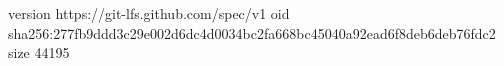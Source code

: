 version https://git-lfs.github.com/spec/v1
oid sha256:277fb9ddd3c29e002d6dc4d0034bc2fa668bc45040a92ead6f8deb6deb76fdc2
size 44195
